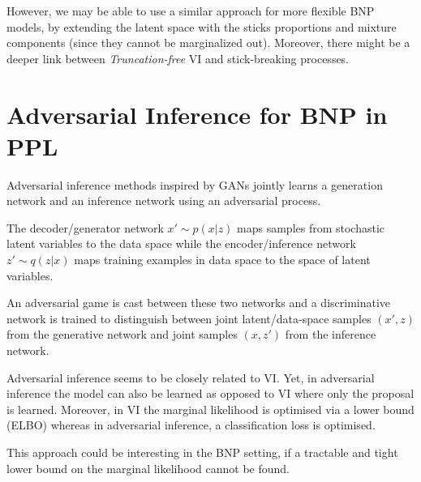 However, we may be able to use a similar approach for more flexible \gls{BNP} models, by extending the latent space with the sticks proportions and mixture components (since they cannot be marginalized out).
Moreover, there might be a deeper link between \textit{Truncation-free} \gls{VI} and stick-breaking processes.



\section{Adversarial Inference for \gls{BNP} in \gls{PPL}}
Adversarial inference methods \cite{Dumoulin:2016td, Donahue:2016wo, DBLP:conf/icml/MeschederNG17} inspired by GANs \cite{Goodfellow:2014wp} jointly learns a generation network and an inference network using an adversarial process.

The decoder/generator network $x' \sim p(x|z)$ maps samples from stochastic latent variables to the data space while the encoder/inference network $z' \sim q(z|x)$ maps training examples in data space to the space of latent variables.

An adversarial game is cast between these two networks and a discriminative network is trained to distinguish between joint latent/data-space samples $(x', z)$ from the generative network and joint samples $(x, z')$ from the inference network.

Adversarial inference seems to be closely related to \gls{VI}. Yet, in adversarial inference the model can also be learned as opposed to \gls{VI} where only the proposal is learned. Moreover, in \gls{VI} the marginal likelihood is optimised via a lower bound (ELBO) whereas in adversarial inference, a classification loss is optimised.

This approach could be interesting in the \gls{BNP} setting, if a tractable and tight lower bound on the marginal likelihood cannot be found.
